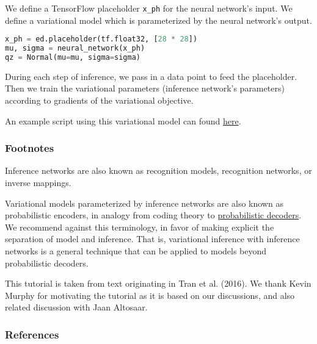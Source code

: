 We define a TensorFlow placeholder \texttt{x_ph} for the neural network's input.
We define a variational model which is parameterized by the neural network's
output.
\begin{lstlisting}[language=Python]
x_ph = ed.placeholder(tf.float32, [28 * 28])
mu, sigma = neural_network(x_ph)
qz = Normal(mu=mu, sigma=sigma)
\end{lstlisting}
During each step of inference, we pass in a data point to feed the
placeholder. Then we train the variational parameters (inference
network's parameters) according to
gradients of the variational objective.

An example script using this variational model can found
\href{https://github.com/blei-lab/edward/blob/master/examples/convolutional_vae.py}
{here}.

\subsubsection{Footnotes}

Inference networks are also known as recognition models, recognition
networks, or inverse mappings.

Variational models parameterized by
inference networks are also known as probabilistic encoders, in
analogy from coding theory to
\href{tut_decoder.html}{probabilistic decoders}.
We recommend against this terminology,
in favor of making explicit the separation of model and inference.
That is,
variational inference with inference networks is a
general technique that can be applied to models beyond
probabilistic decoders.

This tutorial is taken from text originating in Tran et al. (2016).
We thank Kevin Murphy for motivating the tutorial as it is based
on our discussions, and also related discussion with Jaan Altosaar.

\subsubsection{References}\label{references}

